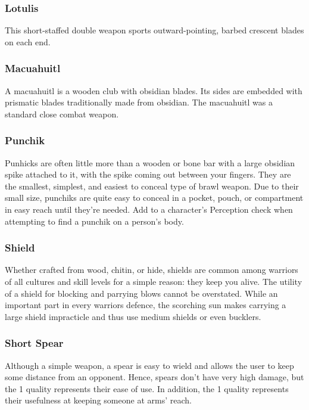 \begin{multicols}{2}
\subsubsection{Lotulis}
\label{itmmlee:lotulis}
This short-staffed double weapon sports outward-pointing,
barbed crescent blades on each end.

\subsubsection{Macuahuitl}
\label{itmmlee:macuahuitl}
A macuahuitl is a wooden club with obsidian blades. Its sides
are embedded with prismatic blades traditionally made from
obsidian. The macuahuitl was a standard close combat weapon.

\subsubsection{Punchik}
\label{itmmlee:punchik}
Punhicks are often little more than a wooden or bone
bar with a large obsidian spike attached to it, with the spike
coming out between your fingers. They are the smallest, simplest,
and easiest to conceal type of brawl weapon. Due to their
small size, punchiks are quite easy to conceal in a pocket,
pouch, or compartment in easy reach until they're needed. Add
\setback to a character's Perception check when attempting to
find a punchik on a person's body.

\subsubsection{Shield}
\label{itmmlee:shield}
Whether crafted from wood, chitin, or hide, shields are
common among warriors of all cultures and skill levels for
a simple reason: they keep you alive. The utility of a shield
for blocking and parrying blows cannot be overstated. While
an important part in every warriors defence, the scorching sun
makes carrying a large shield impracticle and thus use medium
shields or even bucklers.

\subsubsection{Short Spear}
\label{itmmlee:shortspear}
Although a simple weapon, a spear is easy to wield and
allows the user to keep some distance from an opponent.
Hence, spears don’t have very high damage, but
the  1 quality represents their ease of use.
In addition, the  1 quality represents
their usefulness at keeping someone at arms' reach.


\end{multicols}
